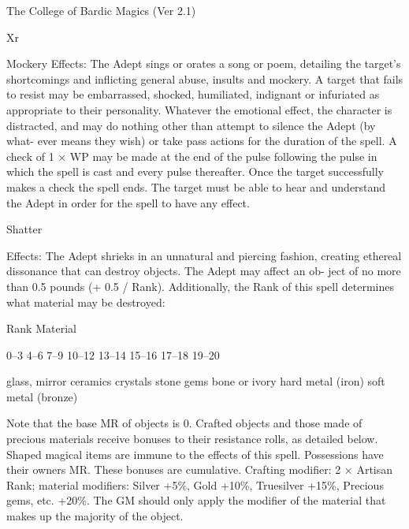 \begin{Chapter}{The College of Bardic Magics (Ver 2.1)}
\begin{tarularx}{\columnwidth}{Xr}
\begin{spell}[G-6]{Mockery }
Effects: The Adept sings or orates a song or poem, 
detailing  the  target’s  shortcomings  and  inflicting 
general  abuse,  insults  and  mockery.  A  target  that 
fails  to  resist  may  be  embarrassed,  shocked,  humiliated,  indignant  or  infuriated  as  appropriate  to 
their  personality.  Whatever  the  emotional  effect, 
the  character  is  distracted,  and  may  do  nothing 
other  than  attempt  to  silence  the  Adept  (by  what-
ever means they  wish) or take pass actions for the 
duration  of  the  spell.  A  check  of  1  ×  WP  may  be 
made at the end of the pulse following the pulse in 
which  the  spell  is  cast  and  every  pulse  thereafter. 
Once  the  target  successfully  makes  a  check  the 
spell  ends.  The  target  must  be  able  to  hear  and 
understand the Adept in order for the spell to have 
any effect. 
\end{spell}

\begin{spell}[G-7]{Shatter }

Effects:  The  Adept  shrieks  in  an  unnatural  and 
piercing  fashion,  creating  ethereal  dissonance  that 
can  destroy  objects.  The  Adept  may  affect  an  ob-
ject  of  no  more  than  0.5  pounds  (+  0.5  /  Rank). 
Additionally,  the  Rank  of  this  spell  determines 
what material may be destroyed: 

Rank  Material 

0–3 
4–6 
7–9 
10–12 
13–14 
15–16 
17–18 
19–20 

glass, mirror 
ceramics 
crystals 
stone 
gems 
bone or ivory 
hard metal (iron) 
soft metal (bronze) 

Note  that  the  base  MR  of  objects  is  0.  Crafted 
objects  and  those  made  of  precious  materials  receive  bonuses  to  their  resistance  rolls,  as  detailed 
below.  Shaped  magical  items  are  immune  to  the 
effects of this spell. Possessions have their owners 
MR. These bonuses are cumulative. Crafting modifier:  2  ×  Artisan  Rank;  material  modifiers:  Silver 
+5\%,  Gold  +10\%,  Truesilver  +15\%,  Precious 
gems,  etc.  +20\%.  The  GM  should  only  apply  the 
modifier of the material that makes up the majority 
of the object. 
\end{spell}


\end{tarularx}
\end{Chapter}
